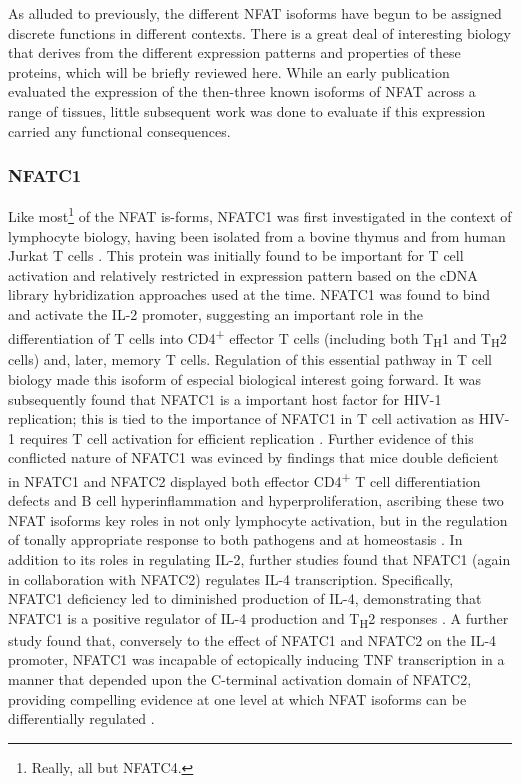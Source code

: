 As alluded to previously, the different NFAT isoforms have begun to be assigned discrete functions in different contexts. There is a great deal of interesting biology that derives from the different expression patterns and properties of these proteins, which will be briefly reviewed here. While an early publication \citep{Masuda1995} evaluated the expression of the then-three known isoforms of NFAT across a range of tissues, little subsequent work was done to evaluate if this expression carried any functional consequences. 

\subsubsection{NFATC1}\label{nfatc1}

Like most\footnote{Really, all but NFATC4.} of the NFAT is-forms, NFATC1 was first investigated in the context of lymphocyte biology, having been isolated from a bovine thymus and from human Jurkat T cells \citep{Northrop1994}. This protein was initially found to be important for T cell activation and relatively restricted in expression pattern based on the cDNA library hybridization approaches used at the time. NFATC1 was found to bind and activate the IL-2 promoter, suggesting an important role in the differentiation of T cells into CD4\textsuperscript{+} effector T cells (including both T\textsubscript{H}1 and T\textsubscript{H}2 cells) and, later, memory T cells. Regulation of this essential pathway in T cell biology made this isoform of especial biological interest going forward. It was subsequently found that NFATC1 is a important host factor for HIV-1 replication; this is tied to the importance of NFATC1 in T cell activation as HIV-1 requires T cell activation for efficient replication \citep{Kinoshita1997}. Further evidence of this conflicted nature of NFATC1 was evinced by findings that mice double deficient in NFATC1 and NFATC2 displayed both effector CD4\textsuperscript{+} T cell differentiation defects and B cell hyperinflammation and hyperproliferation, ascribing these two NFAT isoforms key roles in not only lymphocyte activation, but in the regulation of tonally appropriate response to both pathogens and at homeostasis \citep{Peng2001}. In addition to its roles in regulating IL-2, further studies found that NFATC1 (again in collaboration with NFATC2) regulates IL-4 transcription. Specifically, NFATC1 deficiency led to diminished production of IL-4, demonstrating that NFATC1 is a positive regulator of IL-4 production and T\textsubscript{H}2 responses \citep{Monticelli2002}. A further study found that, conversely to the effect of NFATC1 and NFATC2 on the IL-4 promoter, NFATC1 was incapable of ectopically inducing TNF transcription in a manner that depended upon the C-terminal activation domain of NFATC2, providing compelling evidence at one level at which NFAT isoforms can be differentially regulated \citep{Kaminuma2008}.

